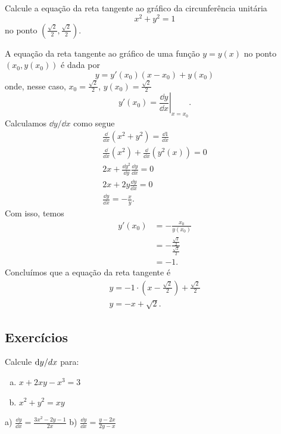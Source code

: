 \begin{exeresol}
  Calcule a equação da reta tangente ao gráfico da circunferência unitária
  \begin{equation}
    x^2 + y^2 = 1
  \end{equation}
  no ponto $\displaystyle\left(\frac{\sqrt{2}}{2}, \frac{\sqrt{2}}{2}\right)$.
\end{exeresol}
\begin{resol}
  A equação da reta tangente ao gráfico de uma função $y = y(x)$ no ponto $(x_0, y(x_0))$ é dada por
  \begin{equation}
    y = y'(x_0)(x - x_0) + y(x_0)
  \end{equation}
  onde, nesse caso, $\displaystyle x_0 = \frac{\sqrt{2}}{2}$, $\displaystyle y(x_0) = \frac{\sqrt{2}}{2}$
  \begin{equation}
    y'(x_0) = \left.\frac{\dd y}{\dd x}\right|_{x=x_0}.
  \end{equation}
  Calculamos $\dd y/\dd x$ como segue
  \begin{gather}
    \frac{\dd}{\dd x}\left(x^2+y^2\right) = \frac{\dd 1}{\dd x} \\
    \frac{\dd}{\dd x}\left(x^2\right) + \frac{\dd}{\dd x}\left(y^2(x)\right) = 0\\
    2x + \frac{\dd y^2}{\dd y}\frac{\dd y}{\dd x} = 0\\
    2x + 2y\frac{\dd y}{\dd x} = 0\\
    \frac{\dd y}{\dd x} = -\frac{x}{y}.
  \end{gather}
  Com isso, temos
  \begin{align}
    y'(x_0) &= -\frac{x_0}{y(x_0)}\\
            &= -\frac{\frac{\sqrt{2}}{2}}{\frac{\sqrt{2}}{2}}\\
            &= -1.
  \end{align}
  Concluímos que a equação da reta tangente é
  \begin{gather}
    y = -1\cdot \left(x - \frac{\sqrt{2}}{2}\right) + \frac{\sqrt{2}}{2}\\
    y = -x + \sqrt{2}.
  \end{gather}
\end{resol}

\subsection*{Exercícios}

\begin{exer}
  Calcule $\mathrm{d} y/\\d x$ para:
  \begin{enumerate}[a)]
  \item $x + 2xy - x^3 = 3$
  \item $x^2 + y^2 = xy$
  \end{enumerate}
\end{exer}
\begin{resp}
  a) $\displaystyle \frac{\dd y}{\dd x} = \frac{3x^2 - 2y - 1}{2x}$ b) $\displaystyle \frac{\dd y}{\dd x} = \frac{y - 2x}{2y - x}$
\end{resp}

